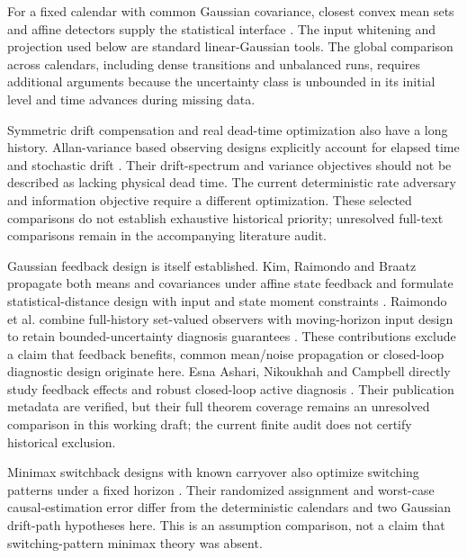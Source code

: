 \documentclass[11pt]{article}
\begin{document}
For a fixed calendar with common Gaussian covariance, closest convex mean sets
and affine detectors supply the statistical interface \cite{convex}.
The input whitening and projection used below are standard linear-Gaussian
tools. The global comparison across calendars, including dense transitions
and unbalanced runs, requires additional arguments because the uncertainty
class is unbounded in its initial level and time advances during missing data.

Symmetric drift compensation and real dead-time optimization also have a long
history. Allan-variance based observing designs explicitly account for elapsed
time and stochastic drift \cite{allan}.
Their drift-spectrum and variance objectives should not be described as lacking
physical dead time. The current deterministic rate adversary and information
objective require a different optimization. These selected comparisons do not
establish exhaustive historical priority; unresolved full-text comparisons remain
in the accompanying literature audit.


Gaussian feedback design is itself established. Kim, Raimondo and Braatz
propagate both means and covariances under affine state feedback and formulate
statistical-distance design with input and state moment constraints \cite{kim}.
Raimondo et al. combine full-history set-valued observers with moving-horizon
input design to retain bounded-uncertainty diagnosis guarantees \cite{closedset}.
These contributions exclude a claim that feedback benefits, common mean/noise
propagation or closed-loop diagnostic design originate here.
Esna Ashari, Nikoukhah and Campbell directly study feedback effects and robust
closed-loop active diagnosis \cite{feedback2012,robustfeedback2012}.
Their publication metadata are verified, but their full theorem coverage remains
an unresolved comparison in this working draft; the current finite audit does
not certify historical exclusion.

Minimax switchback designs with known carryover also optimize switching patterns
under a fixed horizon \cite{switchback}. Their randomized assignment and
worst-case causal-estimation error differ from the deterministic calendars and
two Gaussian drift-path hypotheses here. This is an assumption comparison,
not a claim that switching-pattern minimax theory was absent.
\end{document}
